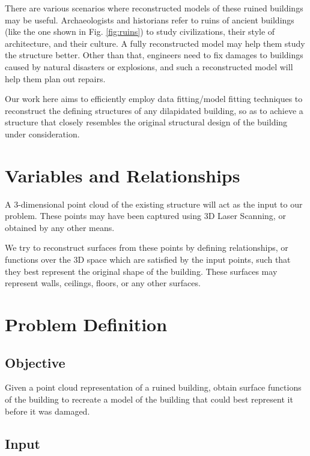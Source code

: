 \documentclass[12pt,a4paper]{article}
\begin{document}
    There are various scenarios where reconstructed models of these ruined buildings may be useful. Archaeologists and historians refer to ruins of ancient buildings (like the one shown in Fig. \ref{fig:ruins}) to study civilizations, their style of architecture, and their culture. A fully reconstructed model may help them study the structure better. Other than that, engineers need to fix damages to buildings caused by natural disasters or explosions, and such a reconstructed model will help them plan out repairs.
    
    Our work here aims to efficiently employ data fitting/model fitting techniques to reconstruct the defining structures of any dilapidated building, so as to achieve a structure that closely resembles the original structural design of the building under consideration.
    
    
    
    \section{Variables and Relationships}
    
    A 3-dimensional point cloud of the existing structure will act as the input to our problem. These points may have been captured using 3D Laser Scanning, or obtained by any other means.
    
    We try to reconstruct surfaces from these points by defining relationships, or functions over the 3D space which are satisfied by the input points, such that they best represent the original shape of the building. These surfaces may represent walls, ceilings, floors, or any other surfaces.
    
    \section{Problem Definition}
    
    \subsection{Objective}
    
    Given a point cloud representation of a ruined building, obtain surface functions of the building to recreate a model of the building that could best represent it before it was damaged.
    
    \subsection{Input}
    
\end{document}
